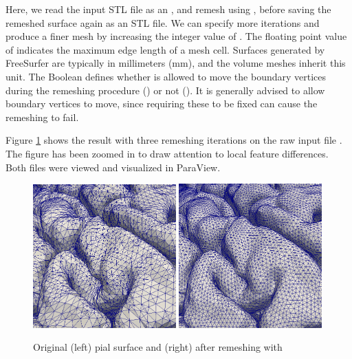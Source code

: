 \noindent Here, we read the input STL file as an \svmtk{}
, and remesh using
, before saving the remeshed
surface again as an STL file. We can specify more iterations and
produce a finer mesh by increasing the integer value of
. The floating point value of 
indicates the maximum edge length of a mesh cell. Surfaces generated
by FreeSurfer are typically in millimeters (mm), and the volume meshes
inherit this unit. The Boolean
 defines whether \svmtk{}
is allowed to move the boundary vertices during the remeshing
procedure () or not (). It is
generally advised to allow boundary vertices to move, since requiring
these to be fixed can cause the remeshing to fail.

Figure \ref{fig:chp3:ernie-remesh} shows the result
 with three remeshing iterations on the raw
input file . The figure has been zoomed in to draw
attention to local feature differences. Both files were viewed
and visualized in ParaView.
\begin{figure}
  \centering
  \includegraphics[width=0.49\textwidth]{./graphics/chp3/raw-stlmesh.png}
  \includegraphics[width=0.49\textwidth]{./graphics/chp3/remesh-stlmesh.png}
  \caption{Original (left) pial surface and (right) after remeshing with \svmtk{}}
  \label{fig:chp3:ernie-remesh}
\end{figure}


